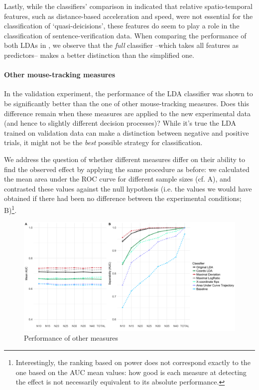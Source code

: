 \documentclass{article}
\begin{document}
Lastly, while the classifiers' comparison in   indicated that relative spatio-temporal features, such as distance-based acceleration and speed, were not essential for the classification of `quasi-deicisions', these features do seem to play a role in the classification of sentence-verification data. When comparing the performance of both LDAs in , we observe that the \emph{full} classifier --which takes all features as predictors-- makes a better distinction than the simplified one.   

\paragraph{Other mouse-tracking measures}
In the validation experiment, the performance of the LDA classifier was shown to be significantly better than the one of other mouse-tracking measures. Does this difference remain when these measures are applied to the new experimental data (and hence to slightly different decision processes)? 
While it's true the LDA trained on validation data can make a distinction between negative and positive trials, it might not be the \emph{best} possible strategy for classification. 

We address the question of whether different measures differ on their ability to find the observed effect by applying the same procedure as before: we calculated the mean area under the ROC curve for different sample sizes (cf. A), and contrasted these values against the null hypothesis (i.e. the values we would have obtained if there had been no difference between the experimental conditions; B)\footnote{Interestingly, the ranking based on power does not correspond exactly to the one based on the AUC mean values: how good is each measure at detecting the effect is not necessarily equivalent to its absolute performance.}. 

\begin{figure}
\centering
\includegraphics[width=\textwidth]{auc_permutation_negation_2.png}
\caption{Performance of other measures}
\label{fig:permutation_AUC_negation_measures}
\end{figure}
\end{document}
